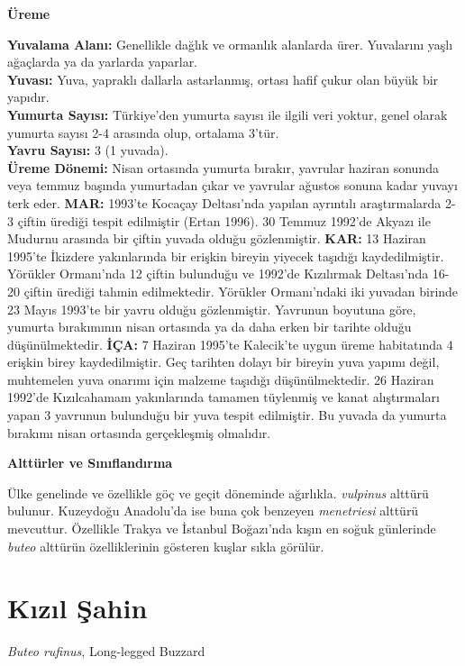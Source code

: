 \documentclass[
  letterpaper,
  DIV=11,
  numbers=noendperiod]{scrreprt}
\begin{document}
\textbf{Üreme}

\textbf{Yuvalama Alanı:} Genellikle dağlık ve ormanlık alanlarda ürer.
Yuvalarını yaşlı ağaçlarda ya da yarlarda yaparlar.\\
\textbf{Yuvası:} Yuva, yapraklı dallarla astarlanmış, ortası hafif çukur
olan büyük bir yapıdır.\\
\textbf{Yumurta Sayısı:} Türkiye'den yumurta sayısı ile ilgili veri
yoktur, genel olarak yumurta sayısı 2-4 arasında olup, ortalama 3'tür.\\
\textbf{Yavru Sayısı:} 3 (1 yuvada).\\
\textbf{Üreme Dönemi:} Nisan ortasında yumurta bırakır, yavrular haziran
sonunda veya temmuz başında yumurtadan çıkar ve yavrular ağustos sonuna
kadar yuvayı terk eder. \textbf{MAR:} 1993'te Kocaçay Deltası'nda
yapılan ayrıntılı araştırmalarda 2-3 çiftin ürediği tespit edilmiştir
(Ertan 1996). 30 Temmuz 1992'de Akyazı ile Mudurnu arasında bir çiftin
yuvada olduğu gözlenmiştir. \textbf{KAR:} 13 Haziran 1995'te İkizdere
yakınlarında bir erişkin bireyin yiyecek taşıdığı kaydedilmiştir.
Yörükler Ormanı'nda 12 çiftin bulunduğu ve 1992'de Kızılırmak
Deltası'nda 16-20 çiftin ürediği tahmin edilmektedir. Yörükler
Ormanı'ndaki iki yuvadan birinde 23 Mayıs 1993'te bir yavru olduğu
gözlenmiştir. Yavrunun boyutuna göre, yumurta bırakımının nisan
ortasında ya da daha erken bir tarihte olduğu düşünülmektedir.
\textbf{İÇA:} 7 Haziran 1995'te Kalecik'te uygun üreme habitatında 4
erişkin birey kaydedilmiştir. Geç tarihten dolayı bir bireyin yuva
yapımı değil, muhtemelen yuva onarımı için malzeme taşıdığı
düşünülmektedir. 26 Haziran 1992'de Kızılcahamam yakınlarında tamamen
tüylenmiş ve kanat alıştırmaları yapan 3 yavrunun bulunduğu bir yuva
tespit edilmiştir. Bu yuvada da yumurta bırakımı nisan ortasında
gerçekleşmiş olmalıdır.

\textbf{Alttürler ve Sınıflandırma}

Ülke genelinde ve özellikle göç ve geçit döneminde ağırlıkla.
\emph{vulpinus} alttürü bulunur. Kuzeydoğu Anadolu'da ise buna çok
benzeyen \emph{menetriesi} alttürü mevcuttur. Özellikle Trakya ve
İstanbul Boğazı'nda kışın en soğuk günlerinde \emph{buteo} alttürün
özelliklerinin gösteren kuşlar sıkla görülür.

\section{Kızıl Şahin}\label{kux131zux131l-ux15fahin}

\emph{Buteo rufinus}, Long-legged Buzzard
\end{document}
